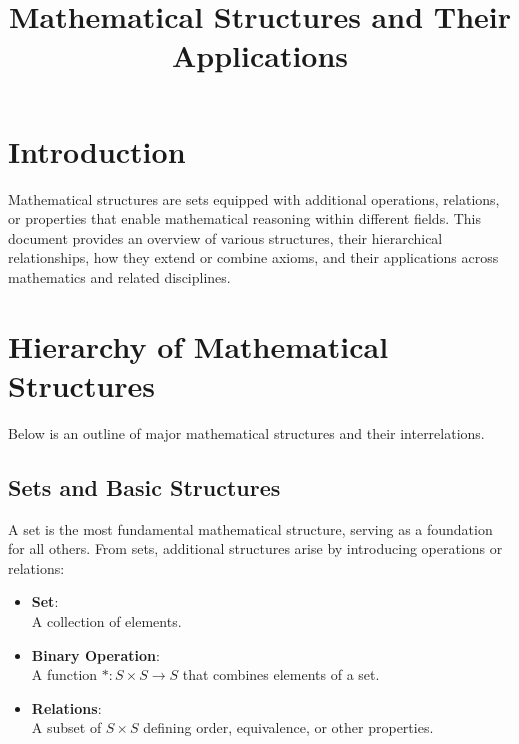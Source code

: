 \documentclass{article}
\title{Mathematical Structures and Their Applications}
\author{}
\date{}
\begin{document}
\maketitle

\section{Introduction}
Mathematical structures are sets equipped with additional operations, 
relations, or properties that enable mathematical 
reasoning within different fields. 
This document provides an overview of various structures, 
their hierarchical relationships, how they extend or combine axioms, 
and their applications across mathematics and related disciplines.

\section{Hierarchy of Mathematical Structures}
Below is an outline of major mathematical structures 
and their interrelations.

\subsection{Sets and Basic Structures}
A set is the most fundamental mathematical structure, 
serving as a foundation for all others. From sets, 
additional structures arise by introducing operations or relations:
\begin{itemize}
    \item \textbf{Set}: \\ 
        A collection of elements.
    \item \textbf{Binary Operation}:  \\
        A function \( *: S \times S \to S \) that combines 
        elements of a set.
    \item \textbf{Relations}: \\ 
        A subset of \( S \times S \) defining order, 
        equivalence, or other properties.
\end{itemize}
\end{document}

